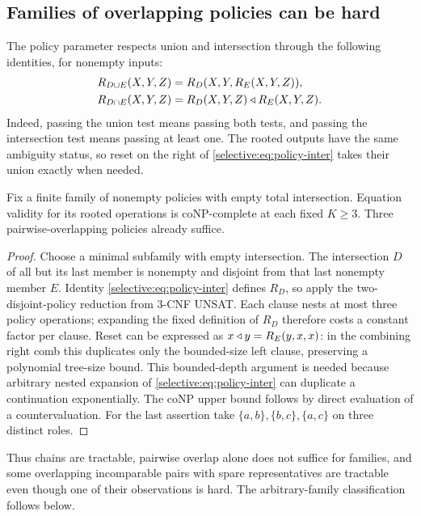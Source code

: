 \subsection{Families of overlapping policies can be hard}

The policy parameter respects union and intersection through the
following identities, for nonempty inputs:
\begin{align}
 R_{D\cup E}(X,Y,Z)&=R_D(X,Y,R_E(X,Y,Z)),
 \label{selective:eq:policy-union}\\
 R_{D\cap E}(X,Y,Z)&=R_D(X,Y,Z)\mathbin{\triangleleft} R_E(X,Y,Z).
 \label{selective:eq:policy-inter}
\end{align}
Indeed, passing the union test means passing both tests, and passing
the intersection test means passing at least one. The rooted outputs
have the same ambiguity status, so reset on the right of
\eqref{selective:eq:policy-inter} takes their union exactly when
needed.

\begin{proposition}\label{selective:prop:empty-inter}
Fix a finite family of nonempty policies with empty total intersection.
Equation validity for its rooted operations is coNP-complete at each
fixed $K\geq3$. Three pairwise-overlapping policies already suffice.
\end{proposition}
\begin{proof}
Choose a minimal subfamily with empty intersection. The intersection
$D$ of all but its last member is nonempty and disjoint from that
last nonempty member $E$. Identity
\eqref{selective:eq:policy-inter} defines $R_D$, so apply the
two-disjoint-policy reduction from 3-CNF UNSAT. Each clause nests at
most three policy operations; expanding the fixed definition of $R_D$
therefore costs a constant factor per clause. Reset can be expressed
as $x\mathbin{\triangleleft} y=R_E(y,x,x)$: in the combining right comb this duplicates
only the bounded-size left clause, preserving a polynomial tree-size
bound. This bounded-depth argument is needed because arbitrary nested
expansion of \eqref{selective:eq:policy-inter} can duplicate a
continuation exponentially. The coNP upper bound follows by direct
evaluation of a countervaluation. For the last assertion take
$\{a,b\},\{b,c\},\{a,c\}$ on three distinct roles.
\end{proof}

Thus chains are tractable, pairwise overlap alone does not suffice for
families, and some overlapping incomparable pairs with spare representatives are
tractable even though one of their observations is hard. The
arbitrary-family classification follows below.

